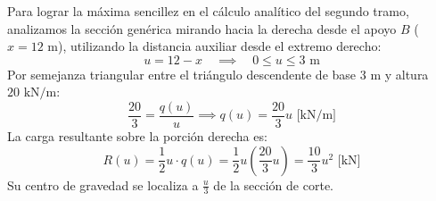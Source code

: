
Para lograr la máxima sencillez en el cálculo analítico del segundo tramo, analizamos la sección genérica mirando hacia la derecha desde el apoyo $B$ ($x = 12\text{ m}$), utilizando la distancia auxiliar desde el extremo derecho:
\begin{equation}
    u = 12 - x \quad \implies \quad 0 \le u \le 3\text{ m}
\end{equation}
Por semejanza triangular entre el triángulo descendente de base $3\text{ m}$ y altura $20\text{ kN/m}$:
\begin{equation}
    \frac{20}{3} = \frac{q(u)}{u} \implies q(u) = \frac{20}{3}u\text{ [kN/m]}
\end{equation}
La carga resultante sobre la porción derecha es:
\begin{equation}
    R(u) = \frac{1}{2} u \cdot q(u) = \frac{1}{2} u \left(\frac{20}{3}u\right) = \frac{10}{3}u^2\text{ [kN]}
\end{equation}
Su centro de gravedad se localiza a $\frac{u}{3}$ de la sección de corte.

